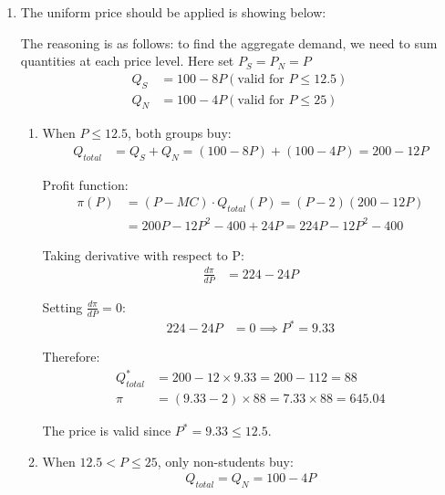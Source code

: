 \documentclass[12pt]{article}
\begin{document}
\begin{enumerate}[label=(\alph*)]
\item The uniform price should be applied is showing below:


The reasoning is as follows: to find the aggregate demand, we need to sum quantities at each price level. Here set $P_S = P_N = P$
\begin{align*}
Q_S &= 100 - 8P (\text{valid for } P \leq 12.5)\\
Q_N &= 100 - 4P (\text{valid for } P \leq 25)
\end{align*}

\begin{enumerate} [label= (\roman*)]

\item When $P \leq 12.5$, both groups buy:
\begin{align*}
Q_{total} &= Q_S + Q_N = (100 - 8P) + (100 - 4P) = 200 - 12P
\end{align*}

Profit function:
\begin{align*}
\pi(P) &= (P - MC) \cdot Q_{total}(P) = (P - 2)(200 - 12P) \\
&= 200P - 12P^2 - 400 + 24P = 224P - 12P^2 - 400
\end{align*}

Taking derivative with respect to P:
\begin{align*}
\frac{d\pi}{dP} &= 224 - 24P
\end{align*}

Setting $\frac{d\pi}{dP} = 0$:
\begin{align*}
224 - 24P &= 0 \implies P^* = 9.33
\end{align*}

Therefore:
\begin{align*}
Q_{total}^* &= 200 - 12 \times 9.33 = 200 - 112 = 88 \\
\pi &= (9.33 - 2) \times 88 = 7.33 \times 88 = 645.04
\end{align*}

The price is valid since $P^* = 9.33 \leq 12.5$.

\item When $12.5 < P \leq 25$, only non-students buy:
\begin{align*}
Q_{total} = Q_N = 100 - 4P
\end{align*}


\end{enumerate}
\end{enumerate}
\end{document}
